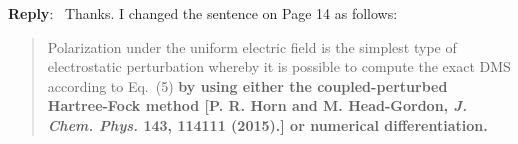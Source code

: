 \documentclass[12pt]{article}
\newenvironment{reply}
 {\medskip \noindent \begin{sf} \color{blue} \textbf{Reply}:\ }
 {\medskip \end{sf}}
\begin{document}
\begin{reply}
Thanks. I changed the sentence on Page 14 as follows:
\begin{quote}
Polarization under the uniform electric field is the simplest type of electrostatic perturbation
whereby it is possible to compute the exact DMS according to Eq.~(5)
\textbf{\noindent
by using either the coupled-perturbed Hartree-Fock method [P. R. Horn and M. Head-Gordon, \emph{J. Chem. Phys.} {\bf 143}, 114111 (2015).]
or numerical differentiation.}
\end{quote}
\end{reply}
\end{document}
